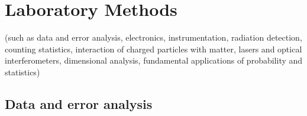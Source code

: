 
\section{Laboratory Methods}
(such as data and error analysis, electronics,
instrumentation, radiation detection,
counting statistics, interaction of
charged particles with matter, lasers
and optical interferometers, dimensional
analysis, fundamental applications
of probability and statistics)


\subsection{Data and error analysis} 

